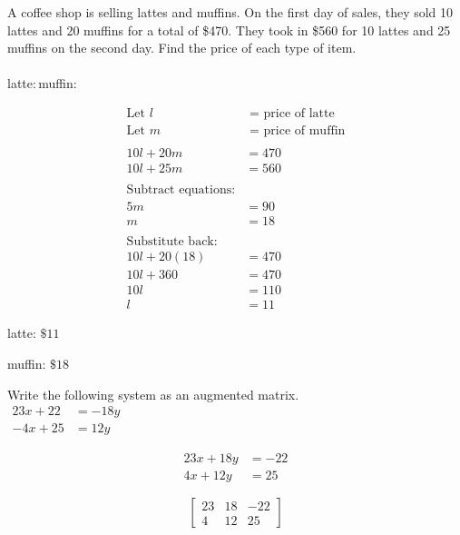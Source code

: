 \documentclass[addpoints]{exam}
\begin{document}
\begin{questions}
\question[4]
A coffee shop is selling lattes and muffins. On the first day of sales, they sold 10 lattes and 20 muffins for a total of \$470. They took in \$560 for 10 lattes and 25 muffins on the second day. Find the price of each type of item.\\ \\
latte:\,\fillin[][1.5in]muffin:\,\fillin[][1.5in]
\begin{solution}
\[\begin{aligned} \text{Let } l &\text{ = price of latte} \\ \text{Let } m &\text{ = price of muffin} \\ \\ 10l + 20m &= 470 \\ 10l + 25m &= 560 \\ \\ \text{Subtract equations:} & \\ 5m &= 90 \\ m &= 18 \\ \\ \text{Substitute back:} & \\ 10l + 20(18) &= 470 \\ 10l + 360 &= 470 \\ 10l &= 110 \\ l &= 11 \end{aligned}\]

latte: \(\boxed{ \text{\$} 11 }\)

muffin: \(\boxed{ \text{\$} 18 }\)
\end{solution}
\newpage

\question[2]
Write the following system as an augmented matrix.\\

\(\displaystyle{ \begin{aligned} 23x + 22 &= -18y \\ -4x + 25 &= 12y \end{aligned} }\)\\
\begin{solution}
\[\begin{aligned} 23x + 18y &= -22 \\ 4x + 12y &= 25 \end{aligned}\]

\[\boxed{ \left[\begin{array}{cc|c} 23 & 18 & -22 \\ 4 & 12 & 25 \end{array}\right] }\]
\end{solution}
\renewcommand{\arraystretch}{1}


\end{questions}
\end{document}
